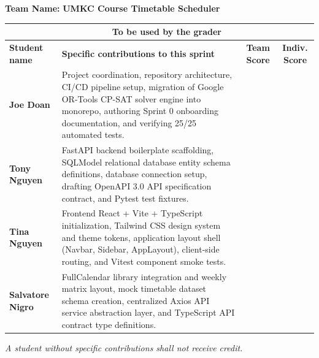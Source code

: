 \documentclass[11pt,letterpaper]{article}
\begin{document}
\vspace{0.4em}
\noindent\textbf{Team Name:} {\large\textbf{\color{umkcblue}UMKC Course Timetable Scheduler}}

\vspace{0.4em}
\renewcommand{\arraystretch}{1.3}
\noindent
\begin{tabularx}{\textwidth}{|p{3.2cm}|X|c|c|}
\hline
\rowcolor{tableheader}
\multicolumn{2}{|c|}{\textbf{\sffamily\color{headerdark}Information provided by the student team}} & \multicolumn{2}{c|}{\textbf{\sffamily\color{headerdark}To be used by the grader}} \\ \hline
\rowcolor{tableheader}
\textbf{\sffamily Student name} & \textbf{\sffamily Specific contributions to this sprint} & \textbf{\sffamily Team Score} & \textbf{\sffamily Indiv. Score} \\ \hline
\textbf{Joe Doan} & Project coordination, repository architecture, CI/CD pipeline setup, migration of Google OR-Tools CP-SAT solver engine into monorepo, authoring Sprint 0 onboarding documentation, and verifying 25/25 automated tests. & & \\ \hline
\textbf{Tony Nguyen} & FastAPI backend boilerplate scaffolding, SQLModel relational database entity schema definitions, database connection setup, drafting OpenAPI 3.0 API specification contract, and Pytest test fixtures. & & \\ \hline
\textbf{Tina Nguyen} & Frontend React + Vite + TypeScript initialization, Tailwind CSS design system and theme tokens, application layout shell (Navbar, Sidebar, AppLayout), client-side routing, and Vitest component smoke tests. & & \\ \hline
\textbf{Salvatore Nigro} & FullCalendar library integration and weekly matrix layout, mock timetable dataset schema creation, centralized Axios API service abstraction layer, and TypeScript API contract type definitions. & & \\ \hline
\end{tabularx}

\vspace{0.4em}
\begin{center}
    \textit{\small *A student without specific contributions shall not receive credit.}
\end{center}

\newpage

\end{document}
